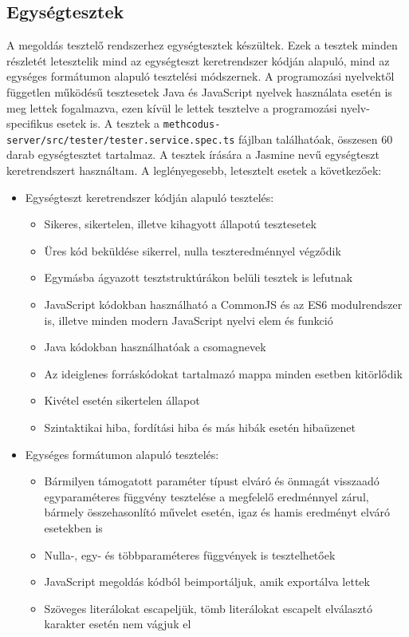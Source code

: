 \documentclass{elteikthesis}
\begin{document}
			\subsection{Egységtesztek}
				A megoldás tesztelő rendszerhez egységtesztek készültek. Ezek a tesztek minden részletét letesztelik mind az egységteszt keretrendszer kódján alapuló, mind az egységes formátumon alapuló tesztelési módszernek. A programozási nyelvektől független működésű tesztesetek Java és JavaScript nyelvek használata esetén is meg lettek fogalmazva, ezen kívül le lettek tesztelve a programozási nyelv-specifikus esetek is. A tesztek a \texttt{methcodus-server/src/tester/tester.service.spec.ts} fájlban találhatóak, összesen 60 darab egységtesztet tartalmaz. A tesztek írására a Jasmine nevű egységteszt keretrendszert használtam. A leglényegesebb, letesztelt esetek a következőek:
				\begin{itemize}
					\item Egységteszt keretrendszer kódján alapuló tesztelés:
					\begin{itemize}
						\setlength\itemsep{-0.5em}
						\item Sikeres, sikertelen, illetve kihagyott állapotú tesztesetek
						\item Üres kód beküldése sikerrel, nulla teszteredménnyel végződik
						\item Egymásba ágyazott tesztstruktúrákon belüli tesztek is lefutnak
						\item JavaScript kódokban használható a CommonJS és az ES6 modulrendszer is, illetve minden modern JavaScript nyelvi elem és funkció
						\item Java kódokban használhatóak a csomagnevek
						\item Az ideiglenes forráskódokat tartalmazó mappa minden esetben kitörlődik
						\item Kivétel esetén sikertelen állapot
						\item Szintaktikai hiba, fordítási hiba és más hibák esetén hibaüzenet
					\end{itemize}
					\item Egységes formátumon alapuló tesztelés:
					\begin{itemize}
						\setlength\itemsep{-0.5em}
						\item Bármilyen támogatott paraméter típust elváró és önmagát visszaadó egyparaméteres függvény tesztelése a megfelelő eredménnyel zárul, bármely összehasonlító művelet esetén, igaz és hamis eredményt elváró esetekben is
						\item Nulla-, egy- és többparaméteres függvények is tesztelhetőek
						\item JavaScript megoldás kódból beimportáljuk, amik exportálva lettek
						\item Szöveges literálokat escapeljük, tömb literálokat escapelt elválasztó karakter esetén nem vágjuk el
					\end{itemize}
				\end{itemize}
			
\end{document}
